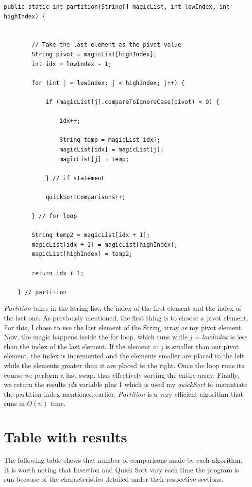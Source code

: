\documentclass[letterpaper, 10pt]{article}
\begin{document}
\begin{lstlisting}
public static int partition(String[] magicList, int lowIndex, int highIndex) {
		
		
		// Take the last element as the pivot value
		String pivot = magicList[highIndex];
		int idx = lowIndex - 1;
		
		for (int j = lowIndex; j < highIndex; j++) {
			
			if (magicList[j].compareToIgnoreCase(pivot) < 0) {
				
				idx++;
				
				String temp = magicList[idx];
				magicList[idx] = magicList[j];
				magicList[j] = temp;
				
			} // if statement
			
			quickSortComparisons++;
				
		} // for loop
		
		String temp2 = magicList[idx + 1];
		magicList[idx + 1] = magicList[highIndex];
		magicList[highIndex] = temp2;
		
		return idx + 1;
		
	} // partition
\end{lstlisting}
\textit{Partition} takes in the String list, the index of the first element and the index of the last one. As previously mentioned, the first thing is to choose a pivot element. For this, I chose to use the last element of the String array as my pivot element. Now, the magic happens inside the for loop, which runs while \textit{j = lowIndex} is less than the index of the last element. If the element at \textit{j} is smaller than our pivot element, the index is incremented and the elements smaller are placed to the left while the elements greater than it are placed to the right. Once the loop runs its course we perform a last swap, thus effectively sorting the entire array. Finally, we return the results \textit{idx} variable plus 1 which is used my \textit{quickSort} to instantiate the partition index mentioned earlier. \textit{Partition} is a very efficient algorithm that runs in $O(n)$ time.

\pagebreak
\section{Table with results}
The following table shows that number of comparisons made by each algorithm. It is worth noting that Insertion and Quick Sort vary each time the program is run because of the characteristics detailed under their respective sections. 
\end{document}
